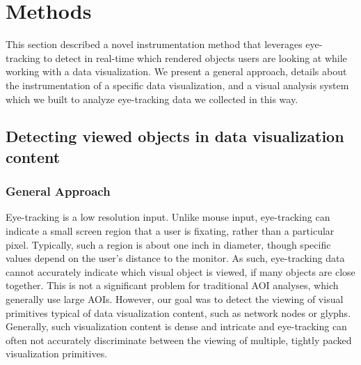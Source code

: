 \section{Methods}\label{sec:Methods}
This section described a novel instrumentation method that leverages eye-tracking to detect in real-time which rendered objects users are looking at while working with a data visualization.  We present a general approach, details about the instrumentation of a specific data visualization, and a visual analysis system which we built to analyze eye-tracking data we collected in this way. 

\subsection{Detecting viewed objects in data visualization content}

\subsubsection{General Approach}
Eye-tracking is a low resolution input. Unlike mouse input, eye-tracking can indicate a small screen region that a user is fixating, rather than a particular pixel. Typically, such a region is about one inch in diameter, though specific values depend on the user's distance to the monitor. As such, eye-tracking data cannot accurately indicate which visual object is viewed, if many objects are close together. This is not a significant problem for traditional AOI analyses, which generally use large AOIs. However, our goal was to detect the viewing of visual primitives typical of data visualization content, such as network nodes or glyphs. Generally, such visualization content is dense and intricate and eye-tracking can often not accurately discriminate between the viewing of multiple, tightly packed visualization primitives. 

